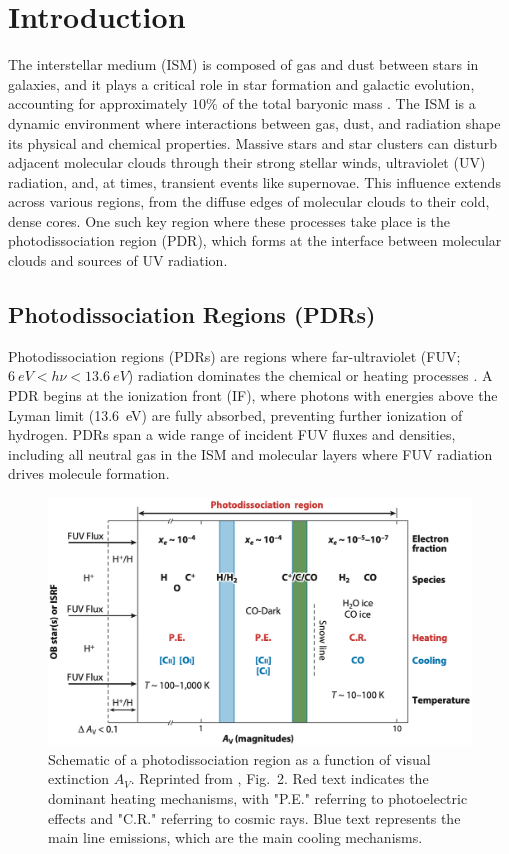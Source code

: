 \documentclass[12pt,a4paper]{article}
\begin{document}
\clearpage
{}
\section{Introduction}

The interstellar medium (ISM) is composed of gas and dust between stars in galaxies, and it plays a critical role in star formation and galactic evolution, accounting for approximately $10\%$ of the total baryonic mass \parencite{Draine2011}. The ISM is a dynamic environment where interactions between gas, dust, and radiation shape its physical and chemical properties. Massive stars and star clusters can disturb adjacent molecular clouds through their strong stellar winds, ultraviolet (UV) radiation, and, at times, transient events like supernovae. This influence extends across various regions, from the diffuse edges of molecular clouds to their cold, dense cores. One such key region where these processes take place is the photodissociation region (PDR), which forms at the interface between molecular clouds and sources of UV radiation.

\subsection{Photodissociation Regions (PDRs)}
Photodissociation regions (PDRs) are regions where far-ultraviolet (FUV; $\qty{6}{eV} < h\nu < \qty{13.6}{eV}$) radiation dominates the chemical or heating processes \parencite{Tielens1985}. A PDR begins at the ionization front (IF), where photons with energies above the Lyman limit (\qty{13.6}{eV}) are fully absorbed, preventing further ionization of hydrogen. PDRs span a wide range of incident FUV fluxes and densities, including all neutral gas in the ISM and molecular layers where FUV radiation drives molecule formation.

\begin{figure}[hb]
    \centering
    \includegraphics[width=.7\textwidth,keepaspectratio]{figures/PDRScheme.png}
    \caption{Schematic of a photodissociation region as a function of visual extinction $A_V$. Reprinted from \textcite{Wolfire2022}, Fig.~2. Red text indicates the dominant heating mechanisms, with "P.E." referring to photoelectric effects and "C.R." referring to cosmic rays. Blue text represents the main line emissions, which are the main cooling mechanisms.} \label{fig:pdrscheme}
\end{figure}
\end{document}
